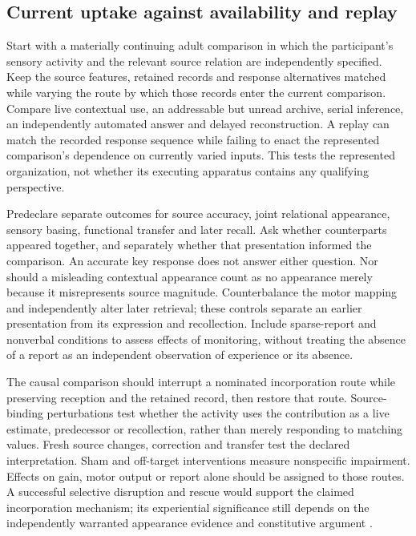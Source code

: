 \subsection{Current uptake against availability and replay}
Start with a materially continuing adult comparison in which the participant's sensory activity and the relevant source relation are independently specified. Keep the source features, retained records and response alternatives matched while varying the route by which those records enter the current comparison. Compare live contextual use, an addressable but unread archive, serial inference, an independently automated answer and delayed reconstruction. A replay can match the recorded response sequence while failing to enact the represented comparison's dependence on currently varied inputs. This tests the represented organization, not whether its executing apparatus contains any qualifying perspective.

Predeclare separate outcomes for source accuracy, joint relational appearance, sensory basing, functional transfer and later recall. Ask whether counterparts appeared together, and separately whether that presentation informed the comparison. An accurate key response does not answer either question. Nor should a misleading contextual appearance count as no appearance merely because it misrepresents source magnitude. Counterbalance the motor mapping and independently alter later retrieval; these controls separate an earlier presentation from its expression and recollection. Include sparse-report and nonverbal conditions to assess effects of monitoring, without treating the absence of a report as an independent observation of experience or its absence.

The causal comparison should interrupt a nominated incorporation route while preserving reception and the retained record, then restore that route. Source-binding perturbations test whether the activity uses the contribution as a live estimate, predecessor or recollection, rather than merely responding to matching values. Fresh source changes, correction and transfer test the declared interpretation. Sham and off-target interventions measure nonspecific impairment. Effects on gain, motor output or report alone should be assigned to those routes. A successful selective disruption and rescue would support the claimed incorporation mechanism; its experiential significance still depends on the independently warranted appearance evidence and constitutive argument \cite[Sections~3--4]{RodgersWholeField2026}\cite[Sections~5--7]{RodgersRelationalAwareness2026}.

